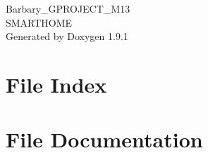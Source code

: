\let\mypdfximage\pdfximage\def\pdfximage{\immediate\mypdfximage}\documentclass[twoside]{book}
\newcommand{\+}{\discretionary{\mbox{\scriptsize$\hookleftarrow$}}{}{}}
\newcommand{\clearemptydoublepage}{%
  \newpage{\pagestyle{empty}\cleardoublepage}%
}
\begin{document}
\raggedbottom

\hypersetup{pageanchor=false,
             bookmarksnumbered=true,
             pdfencoding=unicode
            }
\begin{titlepage}
\vspace*{7cm}
\begin{center}%
{\Large Barbary\+\_\+\+GPROJECT\+\_\+\+M13\\ SMARTHOME}\\
\vspace*{1cm}
{\large Generated by Doxygen 1.9.1}\\
\end{center}
\end{titlepage}
\tableofcontents
\pagebreak
{}
\hypersetup{pageanchor=true}

\chapter{File Index}

\chapter{File Documentation}






















\backmatter
{}
\clearemptydoublepage
{}
\printindex
\end{document}
